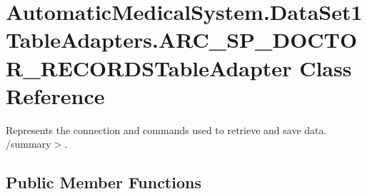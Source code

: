 \section{AutomaticMedicalSystem.DataSet1TableAdapters.ARC\_\-SP\_\-DOCTOR\_\-RECORDSTableAdapter Class Reference}
\label{class_automatic_medical_system_1_1_data_set1_table_adapters_1_1_a_r_c___s_p___d_o_c_t_o_r___r_e_c_o_r_d_s_table_adapter}
Represents the connection and commands used to retrieve and save data. /summary$>$.  


\subsection*{Public Member Functions}
